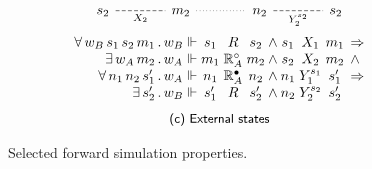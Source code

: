 \documentclass[sigplan,10pt,review]{acmart}
\newcommand{\que}{\circ}
\newcommand{\ans}{\bullet}
\begin{document}
\begin{figure}
\[\begin{array}{c}
\begin{tikzcd}[sep=large,baseline=-3pt]
        s_2 \ar[r, "X_2"', dash, dashed] &
        m_2 \ar[r, dotted, dash] &
        n_2 \ar[r, "Y_2^{s_2}"', dash, dashed] &
        s_2
      \end{tikzcd}
      \vspace{1ex} \\
      \begin{array}{
          r @{\,.\,} l @{{} \Vdash {}} c@{}c@{}c @{\:\wedge\:}
                                    c@{}c@{}c @{\:\:} l}
        \forall \, w_B \, s_1 \, s_2 \, m_1 & w_B & s_1 & {}\mathrel{R}{} & s_2 &
                        s_1 & {}\mathrel{X_1}{} & m_1 & \Rightarrow \\
        \exists \, w_A \, m_2 & w_A & m_1 & {}\mathrel{\mathbb{R}_A^\que}{} & m_2 &
                        s_2 & {}\mathrel{X_2}{} & m_2 & \wedge \\
        \forall \, n_1 \, n_2 \, s_1' & w_A & n_1 & {}\mathrel{\mathbb{R}_A^\ans}{} & n_2 &
                        n_1 & {}\mathrel{Y_1^{s_1}}{} & s_1' & \Rightarrow \\
        \exists \, s_2' & w_B & s_1' & {}\mathrel{R}{} & s_2' &
                        n_2 & {}\mathrel{Y_2^{s_2}}{} & s_2' &
      \end{array}
      \vspace{1.5ex} \\
      \small \textsf{(c) External states}
    \end{array}
  \]
  \caption{Selected forward simulation properties.}
  \label{fig:fsim}
\end{figure}
\end{document}
